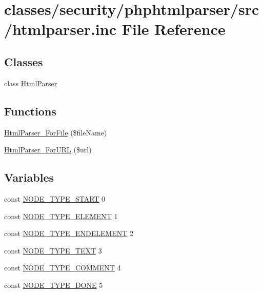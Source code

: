 \hypertarget{htmlparser_8inc}{\section{classes/security/phphtmlparser/src/htmlparser.inc File Reference}
\label{htmlparser_8inc}
}
\subsection*{Classes}
\begin{DoxyCompactItemize}
\item 
class \hyperlink{classHtmlParser}{Html\+Parser}
\end{DoxyCompactItemize}
\subsection*{Functions}
\begin{DoxyCompactItemize}
\item 
\hyperlink{htmlparser_8inc_ac94487036b2502626ad20139fbd55447}{Html\+Parser\+\_\+\+For\+File} (\$file\+Name)
\item 
\hyperlink{htmlparser_8inc_a5a44cdcf889c55ef161e8757329083ce}{Html\+Parser\+\_\+\+For\+U\+R\+L} (\$url)
\end{DoxyCompactItemize}
\subsection*{Variables}
\begin{DoxyCompactItemize}
\item 
const \hyperlink{htmlparser_8inc_a166d4a28318092a1853209f4a4b593ad}{N\+O\+D\+E\+\_\+\+T\+Y\+P\+E\+\_\+\+S\+T\+A\+R\+T} 0
\item 
const \hyperlink{htmlparser_8inc_a4438fb60d0b9e33e67b362cf54287fcd}{N\+O\+D\+E\+\_\+\+T\+Y\+P\+E\+\_\+\+E\+L\+E\+M\+E\+N\+T} 1
\item 
const \hyperlink{htmlparser_8inc_a58ad7dd655550c22edafbeebbcd5d6ad}{N\+O\+D\+E\+\_\+\+T\+Y\+P\+E\+\_\+\+E\+N\+D\+E\+L\+E\+M\+E\+N\+T} 2
\item 
const \hyperlink{htmlparser_8inc_a0d6bda2a274b7906fec57533b143cbdb}{N\+O\+D\+E\+\_\+\+T\+Y\+P\+E\+\_\+\+T\+E\+X\+T} 3
\item 
const \hyperlink{htmlparser_8inc_a009e96537aa78574c49353f00322d777}{N\+O\+D\+E\+\_\+\+T\+Y\+P\+E\+\_\+\+C\+O\+M\+M\+E\+N\+T} 4
\item 
const \hyperlink{htmlparser_8inc_a671e1dd9dd0ecc96e8fbce33c4f4f278}{N\+O\+D\+E\+\_\+\+T\+Y\+P\+E\+\_\+\+D\+O\+N\+E} 5
\end{DoxyCompactItemize}


